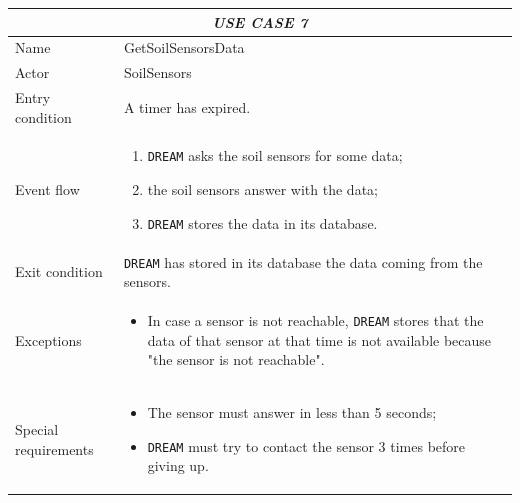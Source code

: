 \documentclass{article}
\begin{document}
\centering
\begin{tabular}{|p{3.5cm}|m{8cm}|}
 \hline
 \multicolumn{2}{|c|}{\emph{USE CASE 7}} \\
 \hline
 Name & GetSoilSensorsData\\
 \hline
 Actor & SoilSensors\\
 \hline
 Entry condition & A timer has expired.\\
 \hline
 Event flow & \begin{enumerate}
    \item \verb|DREAM| asks the soil sensors for some data;
    \item the soil sensors answer with the data;
    \item \verb|DREAM| stores the data in its database.
 \end{enumerate}\\
 \hline
 Exit condition & \verb|DREAM| has stored in its database the data coming from the sensors.\\
 \hline
 Exceptions & \begin{itemize}
     \item In case a sensor is not reachable, \verb|DREAM| stores that the data of that sensor at that time is not available because "the sensor is not reachable".
 \end{itemize}\\
 \hline
 Special requirements &\begin{itemize}
     \item The sensor must answer in less than 5 seconds;
     \item \verb|DREAM| must try to contact the sensor 3 times before giving up.
 \end{itemize}\\
 \hline
\end{tabular}
\end{document}
